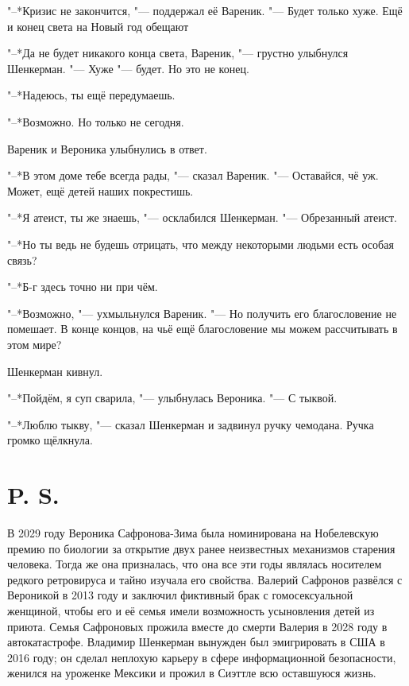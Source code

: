 "--*Кризис не закончится, "--- поддержал её Вареник.
"--- Будет только хуже.
Ещё и конец света на Новый год обещают\ldotst

"--*Да не будет никакого конца света, Вареник, "--- грустно улыбнулся Шенкерман.
"--- Хуже "--- будет.
Но это не конец.

"--*Надеюсь, ты ещё передумаешь.

"--*Возможно.
Но только не сегодня.

Вареник и Вероника улыбнулись в ответ.

"--*В этом доме тебе всегда рады, "--- сказал Вареник.
"--- Оставайся, чё уж.
Может, ещё детей наших покрестишь.

"--*Я атеист, ты же знаешь, "--- осклабился Шенкерман.
"--- Обрезанный атеист.

"--*Но ты ведь не будешь отрицать, что между некоторыми людьми есть особая связь?

"--*Б-г здесь точно ни при чём.

"--*Возможно, "--- ухмыльнулся Вареник.
"--- Но получить его благословение не помешает.
В конце концов, на чьё ещё благословение мы можем рассчитывать в этом мире?

Шенкерман кивнул.

"--*Пойдём, я суп сварила, "--- улыбнулась Вероника.
"--- С тыквой.

"--*Люблю тыкву, "--- сказал Шенкерман и задвинул ручку чемодана.
Ручка громко щёлкнула.

\section{P. S.}

В 2029 году Вероника Сафронова-Зима была номинирована на Нобелевскую премию по биологии за открытие двух ранее неизвестных механизмов старения человека.
Тогда же она призналась, что она все эти годы являлась носителем редкого ретровируса и тайно изучала его свойства.
Валерий Сафронов развёлся с Вероникой в 2013 году и заключил фиктивный брак с гомосексуальной женщиной, чтобы его и её семья имели возможность усыновления детей из приюта.
Семья Сафроновых прожила вместе до смерти Валерия в 2028 году в автокатастрофе.
Владимир Шенкерман вынужден был эмигрировать в США в 2016 году;
он сделал неплохую карьеру в сфере информационной безопасности, женился на уроженке Мексики и прожил в Сиэттле всю оставшуюся жизнь.
